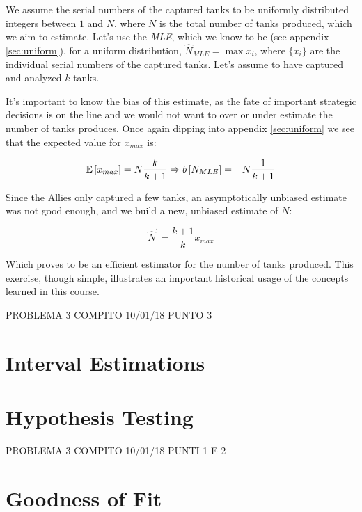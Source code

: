 \begin{exercise}
	We assume the serial numbers of the captured tanks to be uniformly distributed integers between $1$ and $N$, where $N$ is the total number of tanks produced, which we aim to estimate. Let's use the \emph{MLE}, which we know to be (see appendix \ref{sec:uniform}), for a uniform distribution, $\hat{N}_{MLE} = \max{x_i}$, where $\{x_i\}$ are the individual serial numbers of the captured tanks. Let's assume to have captured and analyzed $k$ tanks.
	
	It's important to know the bias of this estimate, as the fate of important strategic decisions is on the line and we would not want to over or under estimate the number of tanks produces. Once again dipping into appendix \ref{sec:uniform} we see that the expected value for $x_{max}$ is:
	
	\[
	\mathbb{E}\left[x_{max}\right] = N \frac{k}{k+1} \Rightarrow b\left[{N}_{MLE}\right] = -N\frac{1}{k+1}
	\]
	
	Since the Allies only captured a few tanks, an asymptotically unbiased estimate was not good enough, and we build a new, unbiased estimate of $N$:
	
	\[
	\hat{N}^\prime = \frac{k+1}{k} x_{max}
	\]
	
	Which proves to be an efficient estimator for the number of tanks produced. This exercise, though simple, illustrates an important historical usage of the concepts learned in this course.	
\end{exercise}


\clearpage
PROBLEMA 3 COMPITO 10/01/18 PUNTO 3

\clearpage
\section{Interval Estimations}\label{exer:interval_est}

\clearpage
\section{Hypothesis Testing}\label{exer:hypoythesis_test}

PROBLEMA 3 COMPITO 10/01/18 PUNTI 1 E 2

\clearpage
\section{Goodness of Fit}\label{exer:gof}